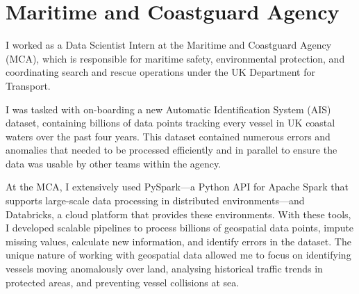 \section{\label{8:sec:MCA}Maritime and Coastguard Agency}

I worked as a Data Scientist Intern at the Maritime and Coastguard Agency (MCA), which is responsible for maritime safety, environmental protection, and coordinating search and rescue operations under the UK Department for Transport.

I was tasked with on-boarding a new Automatic Identification System (AIS) dataset, containing billions of data points tracking every vessel in UK coastal waters over the past four years. This dataset contained numerous errors and anomalies that needed to be processed efficiently and in parallel to ensure the data was usable by other teams within the agency.

At the MCA, I extensively used PySpark---a Python API for Apache Spark that supports large-scale data processing in distributed environments---and Databricks, a cloud platform that provides these environments. With these tools, I developed scalable pipelines to process billions of geospatial data points, impute missing values, calculate new information, and identify errors in the dataset. The unique nature of working with geospatial data allowed me to focus on identifying vessels moving anomalously over land, analysing historical traffic trends in protected areas, and preventing vessel collisions at sea.
